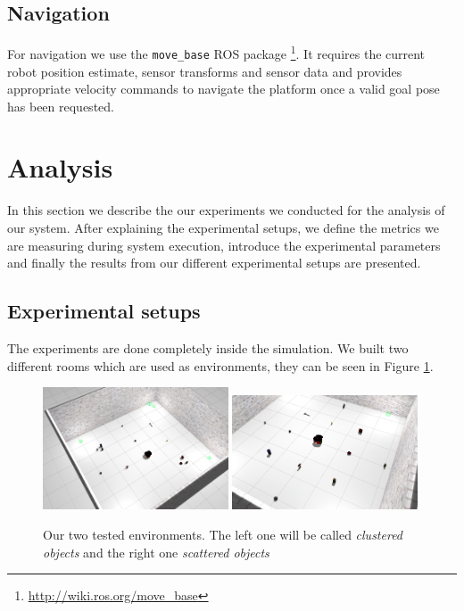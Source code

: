 \documentclass[a4paper,11pt,english]{article}
\begin{document}
\subsection{Navigation}
For navigation we use the \texttt{move\_base} ROS package \footnote{\url{http://wiki.ros.org/move_base}}.
It requires the current robot position estimate, sensor transforms and sensor data and provides appropriate velocity commands to navigate the platform once a valid goal pose has been requested.

\section{Analysis}
\label{Analysis}
In this section we describe the our experiments we conducted for the analysis of our system.
After explaining the experimental setups, we define the metrics we are measuring during system execution, introduce the experimental parameters and finally the results from our different experimental setups are presented.

\subsection{Experimental setups}
The experiments are done completely inside the simulation.
We built two different rooms which are used as environments, they can be seen in Figure \ref{fig:rooms}.

\begin{figure}[h!]
	\begin{center}
		\includegraphics[width=0.49\textwidth]{src/clustered.png}
		\includegraphics[width=0.49\textwidth]{src/scattered.png}
		\caption{Our two tested environments. The left one will be called \textit{clustered objects} and the right one \textit{scattered objects}}
		\label{fig:rooms}
	\end{center}
\end{figure}
\end{document}
